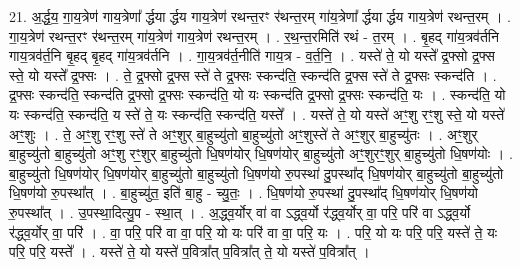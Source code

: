 \documentclass[17pt]{extarticle}
\begin{document}
21. अ॒र्द्ध॒य॒ गा॒य॒त्रेण॑ गाय॒त्रेणा᳚ र्द्धया र्द्धय गाय॒त्रेण॑ रथन्त॒रꣳ र॑थन्त॒रम् गा॑य॒त्रेणा᳚ र्द्धया र्द्धय गाय॒त्रेण॑ रथन्त॒रम् । . गा॒य॒त्रेण॑ रथन्त॒रꣳ र॑थन्त॒रम् गा॑य॒त्रेण॑ गाय॒त्रेण॑ रथन्त॒रम् । . र॒थ॒न्त॒रमिति॑ रथं - त॒रम् । . बृ॒हद् गा॑य॒त्रव॑र्तनि गाय॒त्रव॑र्त॒नि बृ॒हद् बृ॒हद् गा॑य॒त्रव॑र्तनि । . गा॒य॒त्रव॑र्त॒नीति॑ गाय॒त्र - व॒र्त॒नि॒ । . यस्ते॑ ते॒ यो यस्ते᳚ द्र॒फ्सो द्र॒फ्स स्ते॒ यो यस्ते᳚ द्र॒फ्सः । . ते॒ द्र॒फ्सो द्र॒फ्स स्ते॑ ते द्र॒फ्सः स्कन्द॑ति॒ स्कन्द॑ति द्र॒फ्स स्ते॑ ते द्र॒फ्सः स्कन्द॑ति । . द्र॒फ्सः स्कन्द॑ति॒ स्कन्द॑ति द्र॒फ्सो द्र॒फ्सः स्कन्द॑ति॒ यो यः स्कन्द॑ति द्र॒फ्सो द्र॒फ्सः स्कन्द॑ति॒ यः । . स्कन्द॑ति॒ यो यः स्कन्द॑ति॒ स्कन्द॑ति॒ य स्ते॑ ते॒ यः स्कन्द॑ति॒ स्कन्द॑ति॒ यस्ते᳚ । . यस्ते॑ ते॒ यो यस्ते॑ अꣳ॒॒शु रꣳ॒॒शु स्ते॒ यो यस्ते॑ अꣳ॒॒शुः । . ते॒ अꣳ॒॒शु रꣳ॒॒शु स्ते॑ ते अꣳ॒॒शुर् बा॒हुच्यु॑तो बा॒हुच्यु॑तो अꣳ॒॒शुस्ते॑ ते अꣳ॒॒शुर् बा॒हुच्यु॑तः । . अꣳ॒॒शुर् बा॒हुच्यु॑तो बा॒हुच्यु॑तो अꣳ॒॒शु रꣳ॒॒शुर् बा॒हुच्यु॑तो धि॒षण॑योर् धि॒षण॑योर् बा॒हुच्यु॑तो अꣳ॒॒शुरꣳ॒॒शुर् बा॒हुच्यु॑तो धि॒षण॑योः । . बा॒हुच्यु॑तो धि॒षण॑योर् धि॒षण॑योर् बा॒हुच्यु॑तो बा॒हुच्यु॑तो धि॒षण॑यो रु॒पस्था॑ दु॒पस्था᳚द् धि॒षण॑योर् बा॒हुच्यु॑तो बा॒हुच्यु॑तो धि॒षण॑यो रु॒पस्था᳚त् । . बा॒हुच्यु॑त॒ इति॑ बा॒हु - च्यु॒तः॒ । . धि॒षण॑यो रु॒पस्था॑ दु॒पस्था᳚द् धि॒षण॑योर् धि॒षण॑यो रु॒पस्था᳚त् । . उ॒पस्था॒दित्यु॒प - स्था॒त् । . अ॒द्ध्व॒र्योर् वा॑ वा ऽद्ध्व॒र्यो र॑द्ध्व॒र्योर् वा॒ परि॒ परि॑ वा ऽद्ध्व॒र्यो र॑द्ध्व॒र्योर् वा॒ परि॑ । . वा॒ परि॒ परि॑ वा वा॒ परि॒ यो यः परि॑ वा वा॒ परि॒ यः । . परि॒ यो यः परि॒ परि॒ यस्ते॑ ते॒ यः परि॒ परि॒ यस्ते᳚ । . यस्ते॑ ते॒ यो यस्ते॑ प॒वित्रा᳚त् प॒वित्रा᳚त् ते॒ यो यस्ते॑ प॒वित्रा᳚त् । \newline
\end{document}
